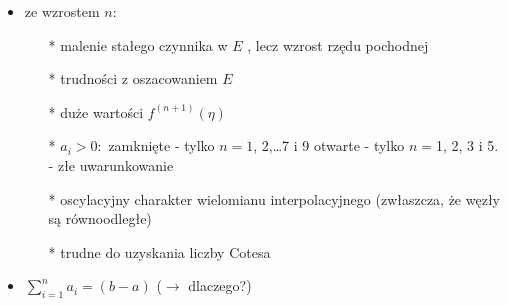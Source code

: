 	\begin{frame}
	\begin{itemize}
		\item ze wzrostem $n$:
        \begin{itemize}
        	\item[*]  malenie stałego czynnika w $E$ , lecz wzrost rzędu pochodnej
            \item[*] trudności z oszacowaniem $E$
            \item[*] duże wartości $f^{(n+1)}(\eta)$
            \item[*] $a_{i}>0:$
            zamknięte - tylko $n=1$, 2,\ldots 7 i 9
            otwarte - tylko $n=$1, 2, 3 i 5. - złe uwarunkowanie
            \item[*] oscylacyjny charakter wielomianu interpolacyjnego (zwłaszcza, że
 			węzły są równoodległe)
            \item[*] trudne do uzyskania liczby Cotesa
        \end{itemize}
       \item $\sum_{i=1}^{n}a_{i}=(b-a)$ ($\rightarrow$ dlaczego?)
	\end{itemize}
	\end{frame}






